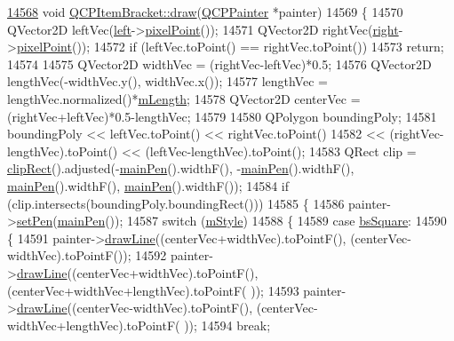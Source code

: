 \begin{DoxyCode}
\hypertarget{a00115_source_l14568}{}\hyperlink{a00033_a8343cf0559c64886add7aa7f4b22f1a6}{14568} \textcolor{keywordtype}{void} \hyperlink{a00033_a8343cf0559c64886add7aa7f4b22f1a6}{QCPItemBracket::draw}(\hyperlink{a00047}{QCPPainter} *painter)
14569 \{
14570   QVector2D leftVec(\hyperlink{a00033_af6cc6d27d96171778c6927d6edce48b0}{left}->\hyperlink{a00038_ae490f9c76ee2ba33752c495d3b6e8fb5}{pixelPoint}());
14571   QVector2D rightVec(\hyperlink{a00033_afa6c1360b05a50c4e0df37b3cebab6be}{right}->\hyperlink{a00038_ae490f9c76ee2ba33752c495d3b6e8fb5}{pixelPoint}());
14572   \textcolor{keywordflow}{if} (leftVec.toPoint() == rightVec.toPoint())
14573     \textcolor{keywordflow}{return};
14574   
14575   QVector2D widthVec = (rightVec-leftVec)*0.5;
14576   QVector2D lengthVec(-widthVec.y(), widthVec.x());
14577   lengthVec = lengthVec.normalized()*\hyperlink{a00033_ab3d99bba8da18eb4d0e0cb23dded33b2}{mLength};
14578   QVector2D centerVec = (rightVec+leftVec)*0.5-lengthVec;
14579 
14580   QPolygon boundingPoly;
14581   boundingPoly << leftVec.toPoint() << rightVec.toPoint()
14582                << (rightVec-lengthVec).toPoint() << (leftVec-lengthVec).toPoint();
14583   QRect clip = \hyperlink{a00022_a538e25ff8856534582f5b2b400a46405}{clipRect}().adjusted(-\hyperlink{a00033_a8df4ad873bf88a4a7bfb9bbbd490e495}{mainPen}().widthF(), -\hyperlink{a00033_a8df4ad873bf88a4a7bfb9bbbd490e495}{mainPen}().widthF(), 
      \hyperlink{a00033_a8df4ad873bf88a4a7bfb9bbbd490e495}{mainPen}().widthF(), \hyperlink{a00033_a8df4ad873bf88a4a7bfb9bbbd490e495}{mainPen}().widthF());
14584   \textcolor{keywordflow}{if} (clip.intersects(boundingPoly.boundingRect()))
14585   \{
14586     painter->\hyperlink{a00047_af9c7a4cd1791403901f8c5b82a150195}{setPen}(\hyperlink{a00033_a8df4ad873bf88a4a7bfb9bbbd490e495}{mainPen}());
14587     \textcolor{keywordflow}{switch} (\hyperlink{a00033_ac911907184c824d621f274f8e0990080}{mStyle})
14588     \{
14589       \textcolor{keywordflow}{case} \hyperlink{a00033_a7ac3afd0b24a607054e7212047d59dbda7f9df4a7359bfe3dac1dbe4ccf5d220c}{bsSquare}:
14590       \{
14591         painter->\hyperlink{a00047_a0b4b1b9bd495e182c731774dc800e6e0}{drawLine}((centerVec+widthVec).toPointF(), (centerVec-widthVec).toPointF());
14592         painter->\hyperlink{a00047_a0b4b1b9bd495e182c731774dc800e6e0}{drawLine}((centerVec+widthVec).toPointF(), (centerVec+widthVec+lengthVec).toPointF(
      ));
14593         painter->\hyperlink{a00047_a0b4b1b9bd495e182c731774dc800e6e0}{drawLine}((centerVec-widthVec).toPointF(), (centerVec-widthVec+lengthVec).toPointF(
      ));
14594         \textcolor{keywordflow}{break};

\end{DoxyCode}
